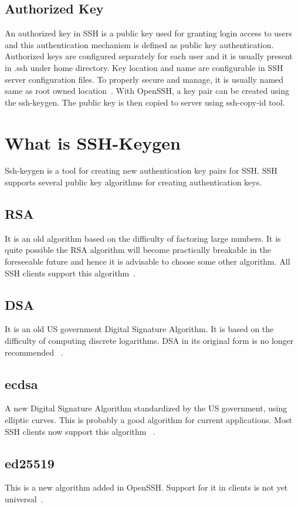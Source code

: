 \subsection{Authorized Key}
An authorized key in SSH is a public key used for granting login access
to users and this authentication mechanism is defined as public key 
authentication. Authorized keys are configured separately for each 
user and it is usually present in .ssh under home directory. 
Key location and name are configurable in SSH server configuration 
files. To properly secure and manage, it is usually named same as 
root owned location~\cite{hid-sp18-513-sshkeyinc}.
With OpenSSH, a key pair can be created using the ssh-keygen.
The public key is then copied to server using ssh-copy-id tool.

\section{What is SSH-Keygen}
Ssh-keygen is a tool for creating new authentication key pairs 
for SSH. SSH supports several public key algorithms for creating
authentication keys. 

\subsection{RSA}
It is an old algorithm based on the difficulty of factoring large 
numbers. It is quite possible the RSA algorithm will become 
practically breakable in the foreseeable future and hence it is 
advisable to choose some other algorithm. All SSH clients support
this algorithm~\cite{hid-sp18-513-sshkeyinc}.

\subsection{DSA}
It is an old US government Digital Signature Algorithm. It is based
on the difficulty of computing discrete logarithms. 
DSA in its original form is no longer recommended
~\cite{hid-sp18-513-sshkeyinc}.

\subsection{ecdsa}
A new Digital Signature Algorithm standardized by the US government,
using elliptic curves. This is probably a good algorithm for current
applications. Most SSH clients now support this algorithm
~\cite{hid-sp18-513-sshkeyinc}.

\subsection{ed25519}
This is a new algorithm added in OpenSSH. Support for it in clients
is not yet universal~\cite{hid-sp18-513-sshkeyinc}. 

